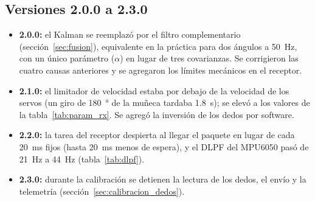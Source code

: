 \subsection{Versiones 2.0.0 a 2.3.0}

\begin{itemize}
    \item \textbf{2.0.0:} el Kalman se reemplazó por el filtro complementario (sección~\ref{sec:fusion}), equivalente en la práctica para dos ángulos a \SI{50}{\hertz}, con un único parámetro ($\alpha$) en lugar de tres covarianzas. Se corrigieron las cuatro causas anteriores y se agregaron los límites mecánicos en el receptor.
    \item \textbf{2.1.0:} el limitador de velocidad estaba por debajo de la velocidad de los servos (un giro de \SI{180}{\degree} de la muñeca tardaba \SI{1.8}{\second}); se elevó a los valores de la tabla~\ref{tab:param_rx}. Se agregó la inversión de los dedos por software.
    \item \textbf{2.2.0:} la tarea del receptor despierta al llegar el paquete en lugar de cada \SI{20}{\milli\second} fijos (hasta \SI{20}{\milli\second} menos de espera), y el DLPF del MPU6050 pasó de \SI{21}{\hertz} a \SI{44}{\hertz} (tabla~\ref{tab:dlpf}).
    \item \textbf{2.3.0:} durante la calibración se detienen la lectura de los dedos, el envío y la telemetría (sección~\ref{sec:calibracion_dedos}).
\end{itemize}
